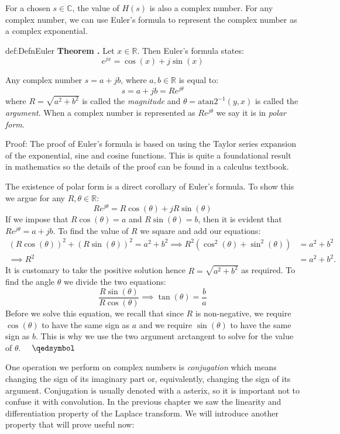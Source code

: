 \documentclass[14pt,a5paper,twoside]{book}
\newenvironment{myTheorem}[2]{ \begin{Theorem}[adjusted title=#1]{}{#2} 
  \textbf{Theorem \thetcbcounter.} \label{#2}}{\end{Theorem}}
\begin{document}
For a chosen $s\in \mathbb{C}$, the value of $H(s)$ is also a complex number. For any complex number, we can use Euler's formula to represent the complex number as a complex exponential. 

\begin{myTheorem}{Euler's Formula and Polar Form}{def:DefnEuler}
Let $x\in\mathbb{R}$. Then Euler's formula states:
$$
e^{jx} = \cos(x) +j\sin(x)
$$

Any complex number $s = a + jb$, where $a,b\in\mathbb{R}$ is equal to:
$$
s = a + jb = Re^{j\theta}
$$
where $R = \sqrt{a^2+b^2}$ is called the \emph{magnitude} and $\theta = \mathrm{atan2}^{-1}(y,x)$ is called the \emph{argument}.
\bigbreak
When a complex number is represented as $Re^{j\theta}$ we say it is in \emph{polar form}.
\end{myTheorem}
Proof: The proof of Euler's formula is based on using the Taylor series expansion of the exponential, sine and cosine functions. This is quite a foundational result in mathematics so the details of the proof can be found in a calculus textbook. 

The existence of polar form is a direct corollary of Euler's formula. To show this we argue for any $R,\theta\in\mathbb{R}$:
$$
Re^{j\theta} = R\cos(\theta) + jR\sin(\theta)
$$
If we impose that $R\cos(\theta) = a$ and $R\sin(\theta) = b$, then it is evident that $Re^{j\theta} = a + jb$. To find the value of $R$ we square and add our equations:
\begin{align*}
\left(R\cos(\theta)\right)^2 + \left(R\sin(\theta)\right)^2 = a^2 + b^2 \implies R^2\left(\cos^2(\theta) + \sin^2(\theta)\right) &= a^2 + b^2 \\ \implies R^2 &= a^2 + b^2.
\end{align*}
It is customary to take the positive solution hence $R=\sqrt{a^2+b^2}$ as required. To find the angle $\theta$ we divide the two equations:
$$
\frac{R\sin(\theta)}{R\cos(\theta)} \implies \tan(\theta) = \frac{b}{a}
$$
Before we solve this equation, we recall that since $R$ is non-negative, we require $\cos(\theta)$ to have the same sign as $a$ and we require $\sin(\theta)$ to have the same sign as $b$. This is why we use the two argument arctangent to solve for the value of $\theta$. $\quad\qedsymbol$

One operation we perform on complex numbers is \emph{conjugation} which means changing the sign of its imaginary part or, equivalently, changing the sign of its argument. Conjugation is usually denoted with a asterix, so it is important not to confuse it with convolution. In the previous chapter we saw the linearity and differentiation property of the Laplace transform. We will introduce another property that will prove useful now:
\end{document}
